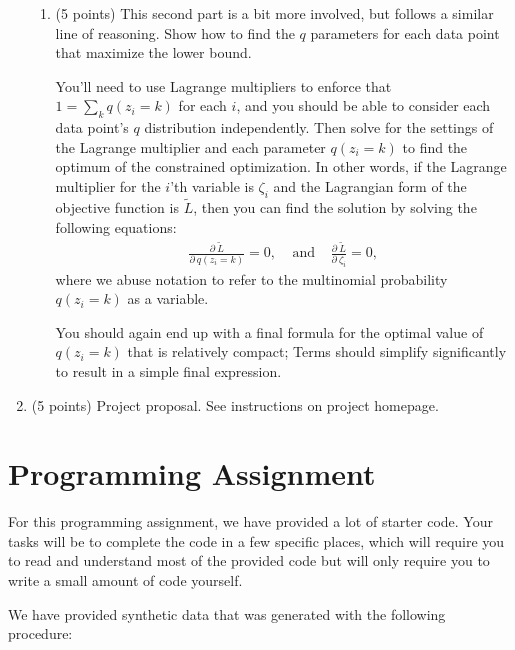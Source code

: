 \documentclass[10pt]{article}
\begin{document}
\begin{enumerate}
\begin{enumerate}
\item (5 points) This second part is a bit more involved, but follows a similar line of reasoning. Show how to find the $q$ parameters for each data point that maximize the lower bound. 

You'll need to use Lagrange multipliers to enforce that $1 = \sum_k q(z_i = k)$ for each $i$, and you should be able to consider each data point's $q$ distribution independently.
Then solve for the settings of the Lagrange multiplier and each parameter $q(z_i = k)$ to find the optimum of the constrained optimization. In other words, if the Lagrange multiplier for the $i$'th variable is $\zeta_i$ and the Lagrangian form of the objective function is $\tilde{L}$, then you can find the solution by solving the following equations:
\begin{equation}
\begin{aligned}
\frac{\partial ~ \tilde{L}}{\partial ~ q(z_i = k)} = 0, ~~~~~\textrm{and}~~~~~ \frac{\partial ~ \tilde{L}}{\partial ~ \zeta_i} = 0,
\end{aligned}
\end{equation}
where we abuse notation to refer to the multinomial probability $q(z_i = k)$ as a variable.

You should again end up with a final formula for the optimal value of $q(z_i = k)$ that is relatively compact; Terms should simplify significantly to result in a simple final expression. 



\end{enumerate}

\item (5 points) Project proposal. See instructions on project homepage.

\end{enumerate}

\section*{Programming Assignment}

For this programming assignment, we have provided a lot of starter code. Your tasks will be to complete the code in a few specific places, which will require you to read and understand most of the provided code but will only require you to write a small amount of code yourself.

We have provided synthetic data that was generated with the following procedure: 
\end{document}
